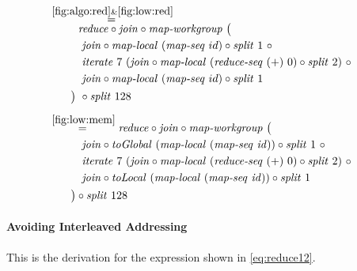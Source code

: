 \begin{align*}
  &\hspace{-2em}\quad\begin{aligned}
    &\overset{\ref{fig:algo:red}\&\ref{fig:low:red}}{=\hspace{.2em}}\\[-.75em]
    &\qquad\ \ 
      \reduce \circ \join \circ \mapWorkgroup\ \big(\\
    &\qquad\quad\join \circ \mapLocal\ (\mapSeq\ id) \circ \splitN\ 1\ \circ\\
    &\qquad\quad\iterateN\ 7\ (\join \circ \mapLocal\ (\reduceSeq\ (+)\ 0) \circ \splitN\ 2)\ \circ\\
    &\qquad\quad\join \circ \mapLocal\ (\mapSeq\ id) \circ \splitN\ 1\\
    &\qquad\big)\ \circ \splitN\ 128
  \end{aligned}\\[.5em]
%
  &\hspace{-2em}\quad\begin{aligned}
    &\overset{\ref{fig:low:mem}}{=\hspace{.2em}}
      \reduce \circ \join \circ \mapWorkgroup\ \big(\\
    &\qquad\quad \join \circ \toGlobal\ (\mapLocal\ (\mapSeq\ \id)) \circ \splitN\ 1\ \circ\\
    &\qquad\quad\iterateN\ 7\ (\join \circ \mapLocal\ (\reduceSeq\ (+)\ 0) \circ \splitN\ 2)\ \circ\\
    &\qquad\quad \join \circ \toLocal\ (\mapLocal\ (\mapSeq\ \id)) \circ \splitN\ 1\\
    &\qquad\big) \circ \splitN\ 128
  \end{aligned}
%  
\end{align*}

\normalsize





\paragraph{Avoiding Interleaved Addressing}
This is the derivation for the expression shown in \autoref{eq:reduce12}.

\small

